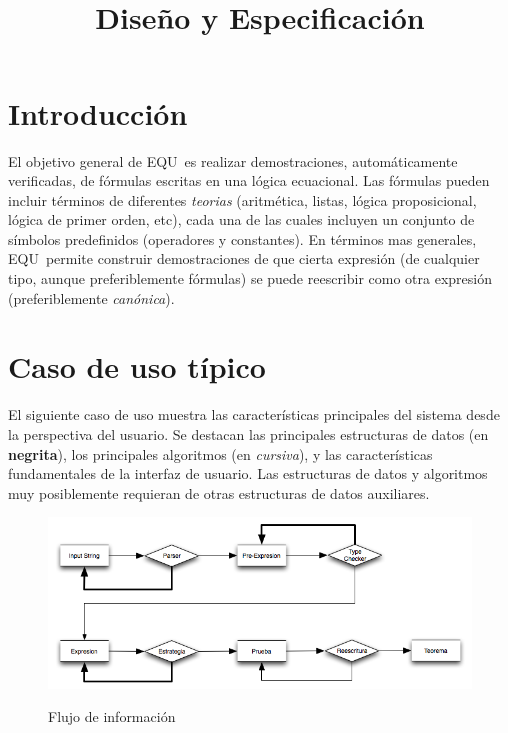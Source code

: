 \documentclass{article}
\title{\equ\\
  Diseño y Especificación}
\newcommand{\equ}{EQU}
\begin{document}
\maketitle

\section{Introducción}
\label{sec:intro}
El objetivo general de \equ\ es realizar demostraciones, automáticamente
verificadas, de fórmulas escritas en una lógica ecuacional. Las fórmulas
pueden incluir términos de diferentes \emph{teorias} (aritmética, listas,
lógica proposicional, lógica de primer orden, etc), cada una de las cuales
incluyen un conjunto de símbolos predefinidos (operadores y constantes). En
términos mas generales, \equ\ permite construir demostraciones de que cierta
expresión (de cualquier tipo, aunque preferiblemente fórmulas) se puede
reescribir como otra expresión (preferiblemente \emph{canónica}).

\section{Caso de uso típico}

El siguiente caso de uso muestra las características principales del sistema
desde la perspectiva del usuario. Se destacan las principales estructuras de
datos (en \textbf{negrita}), los principales algoritmos (en \emph{cursiva}), y
las características fundamentales de la interfaz de usuario. Las estructuras
de datos y algoritmos muy posiblemente requieran de otras estructuras de datos
auxiliares.

\begin{figure}[t]
  \includegraphics[scale=0.5]{flow_equ.png}  
  \label{flow_equ}
  \caption{Flujo de información}
\end{figure}
\end{document}

